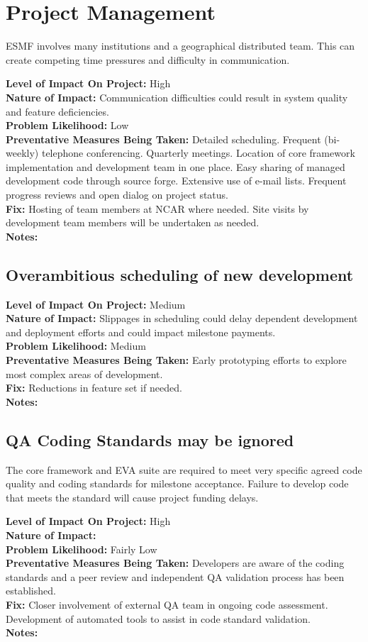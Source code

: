\documentclass[english]{article}
\newcommand{\req}[1]{\section{\hspace{.2in}#1}}
\newcommand{\sreq}[1]{\subsection{\hspace{.2in}#1}}
\newenvironment
{reqlist}
{\begin{list} {} {} \rm \item[]}
{\end{list}}
\begin{document}
\req{Project Management}
ESMF involves many institutions and a geographical distributed team. 
This can create competing time pressures and difficulty in communication.

\begin{reqlist}
{\bf Level of Impact On Project:} High \\
{\bf Nature of Impact:} Communication difficulties could result in system quality and feature deficiencies. \\
{\bf Problem Likelihood:} Low \\
{\bf Preventative Measures Being Taken:} Detailed scheduling. Frequent (bi-weekly) telephone
conferencing. Quarterly meetings. Location of core framework implementation and development
team in one place. Easy sharing of managed development code through source forge. 
Extensive use of e-mail lists. Frequent progress reviews and open dialog on project status.
\\
{\bf Fix:} Hosting of team members at NCAR where needed.
Site visits by development team members will be undertaken as needed.
\\
{\bf Notes:} 
\end{reqlist}

\sreq{Overambitious scheduling of new development}
\begin{reqlist}
{\bf Level of Impact On Project:} Medium \\
{\bf Nature of Impact:} Slippages in scheduling could delay dependent development and deployment efforts and could impact milestone payments.  \\
{\bf Problem Likelihood:} Medium \\
{\bf Preventative Measures Being Taken:} Early prototyping efforts to explore most
complex areas of development.
\\
{\bf Fix:} Reductions in feature set if needed.
\\
{\bf Notes:} 
\end{reqlist}


\sreq{QA Coding Standards may be ignored}
The core framework and EVA suite are required to meet very specific agreed code quality and coding
standards for milestone acceptance. Failure to develop code that meets the
standard will cause project funding delays.
\begin{reqlist}
{\bf Level of Impact On Project:} High \\
{\bf Nature of Impact:} \\
{\bf Problem Likelihood:} Fairly Low \\
{\bf Preventative Measures Being Taken:} Developers are aware of the
coding standards and a peer review and independent QA validation process
has been established.
\\
{\bf Fix:} Closer involvement of external QA team in ongoing code 
assessment. Development of automated tools to assist in code standard validation.
\\
{\bf Notes:} 
\end{reqlist}
\end{document}
